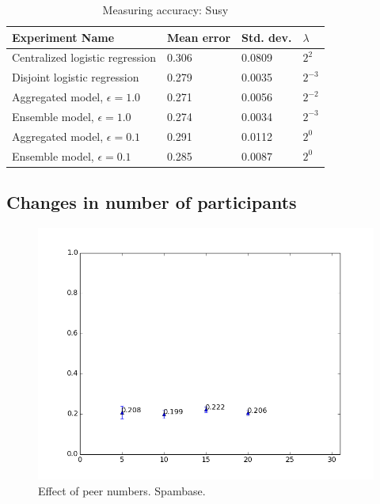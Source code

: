 \begin{table}[H]
	\centering
	\begin{tabular}{|l|l|l|l|}
		{\bf Experiment Name}            & {\bf Mean error} & {\bf Std. dev.} & {\bf $\lambda$} \\
		\hline
		Centralized logistic regression  & 0.306            & 0.0809          & $2^{2}$         \\
		Disjoint logistic regression     & 0.279            & 0.0035          & $2^{-3}$        \\
		Aggregated model, $\epsilon=1.0$ & 0.271            & 0.0056          & $2^{-2}$        \\
		Ensemble model, $\epsilon=1.0$   & 0.274            & 0.0034          & $2^{-3}$        \\
		Aggregated model, $\epsilon=0.1$ & 0.291            & 0.0112          & $2^0$           \\
		Ensemble model, $\epsilon=0.1$   & 0.285            & 0.0087          & $2^0$          
	\end{tabular}
	\caption{Measuring accuracy: Susy}
	\label{tab:results_measuring_accuracy_susy}
\end{table}

\subsection{Changes in number of participants}


\begin{figure}[H]
	\centering
	\includegraphics[width=\textwidth]{fig/spambase/eps1.0,bud1.0,peers5-30,groups5,reg2e-2-puball-peercounts-data150-spam-testmean}
	\caption{Effect of peer numbers. Spambase.}
	\label{fig:peer_range_constant_group_spam}
\end{figure}


